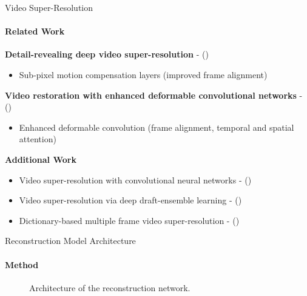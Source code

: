 \documentclass[
	ngerman,
	aspectratio=169,
	color={accentcolor=3d},
	logo=false,
	colorframetitle=true,
	]{tudabeamer}
\begin{document}
\begin{frame}{Video Super-Resolution}
\framesubtitle{Related Work}
\textbf{Detail-revealing deep video super-resolution} - \citet{valillasuperres} (\citeyear{valillasuperres})
\begin{itemize}
    \item Sub-pixel motion compensation layers (improved frame alignment)
\end{itemize}

\vspace{0.5cm}

\textbf{Video restoration with enhanced deformable convolutional networks} - \citet{deformablesuperres} (\citeyear{deformablesuperres})
\begin{itemize}
    \item Enhanced deformable convolution (frame alignment, temporal and spatial attention)
\end{itemize}

\vspace{0.5cm}

\pause

\textbf{Additional Work}
\begin{itemize}
    \item Video super-resolution with convolutional neural networks - \citet{videosuperrescnn} (\citeyear{videosuperrescnn})
    \item Video super-resolution via deep draft-ensemble learning - \citet{videosuperresdraft} (\citeyear{videosuperresdraft})
    \item Dictionary-based multiple frame video super-resolution - \citet{videosuperresdict} (\citeyear{videosuperresdict})
\end{itemize}
\end{frame}


\begin{frame}{Reconstruction Model Architecture}
\framesubtitle{Method}
\vspace{1cm}
\begin{figure}[h!]
    \centering
    
    \caption{Architecture of the reconstruction network.}
    \label{fig:reconstructionnetwork}
\end{figure}
\end{frame}
\end{document}

